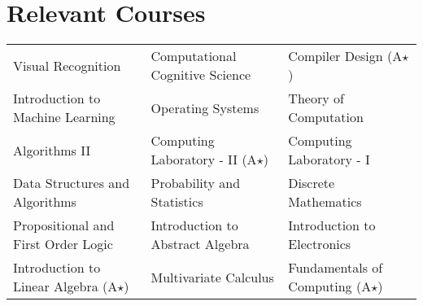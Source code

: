\section*{Relevant Courses}
\begin{tabularx}{\textwidth}{X X X}
    Visual Recognition &
    Computational Cognitive Science &
    Compiler Design (A$\star$) \\
    Introduction to Machine Learning &
    Operating Systems &
    Theory of Computation \\
    Algorithms II &
    Computing Laboratory - II (A$\star$) &
    Computing Laboratory - I \\
    Data Structures and Algorithms &
    Probability and Statistics &
    Discrete Mathematics \\
    Propositional and First Order Logic &
    Introduction to Abstract Algebra &
    Introduction to Electronics \\
    Introduction to Linear Algebra (A$\star$) &
    Multivariate Calculus &
    Fundamentals of Computing (A$\star$)
\end{tabularx}

